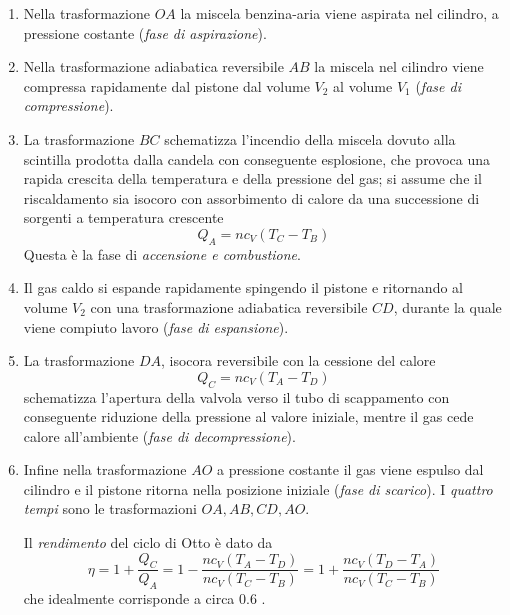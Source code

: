 \documentclass[class=book, crop=false, oneside, 12pt]{standalone}
\begin{document}
\begin{enumerate}
    \item Nella trasformazione \(O A\) la miscela benzina-aria viene aspirata nel cilindro, a pressione costante (\emph{fase di aspirazione}). 
    \item Nella trasformazione adiabatica reversibile \(A B\) la miscela nel cilindro viene compressa rapidamente dal pistone dal volume \(V_2\) al volume \(V_1\) (\emph{fase di compressione}). 
    \item La trasformazione \(B C\) schematizza l'incendio della miscela dovuto alla scintilla prodotta dalla candela con conseguente esplosione, che provoca una rapida crescita della temperatura e della pressione del gas; 
    si assume che il riscaldamento sia isocoro con assorbimento di calore da una successione di sorgenti a temperatura crescente
    \begin{equation*}
        Q_A = n c_V (T_C - T_B)
    \end{equation*}
    Questa è la fase di \emph{accensione e combustione}. 
    \item Il gas caldo si espande rapidamente spingendo il pistone e ritornando al volume \(V_2\) con una trasformazione adiabatica reversibile \(C D\), durante la quale viene compiuto lavoro (\emph{fase di espansione}). 
    \item La trasformazione \(D A\), isocora reversibile con la cessione del calore
    \begin{equation*}
        Q_C = n c_V ( T_A - T_D)
    \end{equation*}
    schematizza l'apertura della valvola verso il tubo di scappamento con conseguente riduzione della pressione al valore iniziale, mentre il gas cede calore all'ambiente (\emph{fase di decompressione}).
    \item Infine nella trasformazione \(A O\) a pressione costante il gas viene espulso dal cilindro e il pistone ritorna nella posizione iniziale (\emph{fase di scarico}). 
    I \emph{quattro tempi} sono le trasformazioni \( O A, AB, CD, A O\). 

    Il \emph{rendimento} del ciclo di Otto è dato da
    \begin{equation*}
        \eta = 1 + \frac{Q_C}{Q_A} = 1 - \frac{n c_V (T_A -T_D)}{n c_V (T_C - T_B)} = 1 + \frac{n c_V (T_D -T_A)}{n c_V (T_C - T_B)}
    \end{equation*}
    che idealmente corrisponde a circa \(0.6\) .
\end{enumerate}
\end{document}
